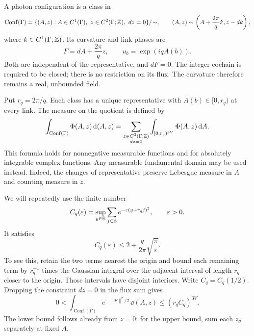 A photon configuration is a class in
\begin{equation}\label{eq:reg-configuration}
 \operatorname{Conf}(\Gamma)
 =\{(A,z):A\in C^1(\Gamma),\ z\in C^2(\Gamma;\mathbb Z),\ dz=0\}/\!\sim,
 \qquad
 (A,z)\sim\left(A+\frac{2\pi}{q}k,z-dk\right),
\end{equation}
where $k\in C^1(\Gamma;\mathbb Z)$. Its curvature and link phases are
\begin{equation}\label{eq:reg-curvature}
 F=dA+\frac{2\pi}{q}z,
 \qquad u_b=\exp(iqA(b)).
\end{equation}
Both are independent of the representative, and $dF=0$. The integer
cochain is required to be closed; there is no restriction on its flux.
The curvature therefore remains a real, unbounded field.

Put $r_q=2\pi/q$. Each class has a unique representative with
$A(b)\in[0,r_q)$ at every link. The measure on the quotient is defined
by
\begin{equation}\label{eq:reg-configuration-integral}
 \int_{\operatorname{Conf}(\Gamma)}\Phi(A,z)\,\mathrm d(A,z)
 =\sum_{\substack{z\in C^2(\Gamma;\mathbb Z)\\dz=0}}
       \int_{[0,r_q)^{3V}}\Phi(A,z)\,\mathrm d A.
\end{equation}
This formula holds for nonnegative measurable functions and for
absolutely integrable complex functions. Any measurable fundamental
domain may be used instead. Indeed, the changes of representative
preserve Lebesgue measure in $A$ and counting measure in $z$.

We will repeatedly use the finite number
\begin{equation}\label{eq:reg-gaussian-sum}
 C_q(\varepsilon)=\sup_{y\in\mathbb R}\sum_{j\in\mathbb Z}
                  e^{-\varepsilon(y+r_qj)^2},\qquad \varepsilon>0.
\end{equation}
It satisfies
\[
 C_q(\varepsilon)\le2+\frac{q}{2\pi}\sqrt{\frac{\pi}{\varepsilon}}.
\]
To see this, retain the two terms nearest the origin and bound each
remaining term by $r_q^{-1}$ times the Gaussian integral over the
adjacent interval of length $r_q$ closer to the origin. Those intervals
have disjoint interiors. Write $C_q=C_q(1/2)$. Dropping the constraint
$dz=0$ in the flux sum gives
\begin{equation}\label{eq:reg-maxwell-integral}
 0<\int_{\operatorname{Conf}(\Gamma)}e^{-\|F\|^2/2}\,\dd(A,z)
 \le(r_qC_q)^{3V}.
\end{equation}
The lower bound follows already from $z=0$; for the upper bound, sum
each $z_\sigma$ separately at fixed $A$.

